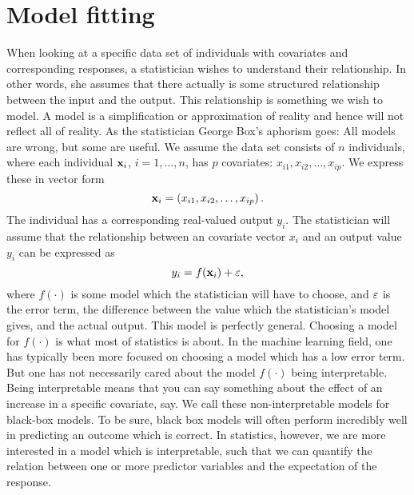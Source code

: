 \chapter{Model fitting}
When looking at a specific data set of individuals with covariates and corresponding responses, a statistician wishes to understand their relationship. In other words, she assumes that there actually is some structured relationship between the input and the output. This relationship is something we wish to model. A model is a simplification or approximation of reality and hence will not reflect all of reality. As the statistician George Box's aphorism goes: All models are wrong, but some are useful. We assume the data set consists of $n$ individuals, where each individual $\mathbf{x}_i$, $i=1,\ldots,n$, has $p$ covariates: $x_{i1},x_{i2},\ldots,x_{ip}$. We express these in vector form
\begin{equation*}
    \mathbf{x}_i=\left(x_{i1},x_{i2},\ldots,x_{ip}\right).
\end{equation*}
The individual has a corresponding real-valued output $y_i$. The statistician will assume that the relationship between an covariate vector $x_i$ and an output value $y_i$ can be expressed as
\begin{equation*}
    y_i=f(\mathbf{x}_i)+\varepsilon,
\end{equation*}
where $f(\cdot)$ is some model which the statistician will have to choose, and $\varepsilon$ is the error term, the difference between the value which the statistician's model gives, and the actual output. This model is perfectly general. Choosing a model for $f(\cdot)$ is what most of statistics is about. In the machine learning field, one has typically been more focused on choosing a model which has a low error term. But one has not necessarily cared about the model $f(\cdot)$ being interpretable. Being interpretable means that you can say something about the effect of an increase in a specific covariate, say. We call these non-interpretable models for black-box models. To be sure, black box models will often perform incredibly well in predicting an outcome which is correct. In statistics, however, we are more interested in a model which is interpretable, such that we can quantify the relation between one or more predictor variables and the expectation of the response.

